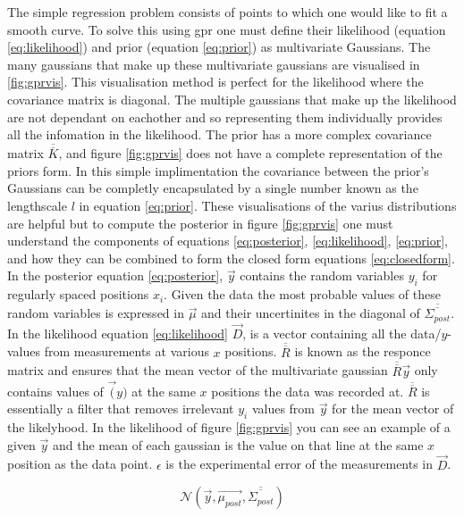 The simple regression problem consists of points to which one would like to fit a smooth curve. To solve this using \gls{gpr} one must define their likelihood (equation \ref{eq:likelihood}) and prior (equation \ref{eq:prior}) as multivariate Gaussians. The many gaussians that make up these multivariate gaussians are visualised in \ref{fig:gprvis}. This visualisation method is perfect for the likelihood where the covariance matrix is diagonal. The multiple gaussians that make up the likelihood are not dependant on eachother and so representing them individually provides all the infomation in the likelihood. The prior has a more complex covariance matrix $\overline{\overline{K}}$, and figure \ref{fig:gprvis} does not have a complete representation of the priors form. In this simple implimentation the covariance between the prior's Gaussians can be completly encapsulated by a single number known as the lengthscale $l$ in equation \ref{eq:prior}. These visualisations of the varius distributions are helpful but to compute the posterior in figure \ref{fig:gprvis} one must understand the components of equations \ref{eq:posterior}, \ref{eq:likelihood}, \ref{eq:prior}, and how they can be combined to form the closed form equations \ref{eq:closedform}. In the posterior equation \ref{eq:posterior}, $\Vec{y}$ contains the random variables $y_i$ for regularly spaced positions $x_i$. Given the data the most probable values of these random variables is expressed in $\Vec{\mu}$ and their uncertinites in the diagonal of $\overline{\overline{\Sigma_{post}}}$. In the likelihood equation \ref{eq:likelihood} $\Vec{D}$, is a vector containing all the data/$y$-values from measurements at various $x$ positions. $\overline{\overline{R}}$ is known as the responce matrix and ensures that the mean vector of the multivariate gaussian $\overline{\overline{R}}\Vec{y}$ only contains values of $\Vec(y)$ at the same $x$ positions the data was recorded at. $\overline{\overline{R}}$ is essentially a filter that removes irrelevant $y_i$ values from $\Vec{y}$ for the mean vector of the likelyhood. In the likelihood of figure \ref{fig:gprvis} you can see an example of a given $\Vec{y}$ and the mean of each gaussian is the value on that line at the same $x$ position as the data point. $\epsilon$ is the experimental error of the measurements in $\Vec{D}$. 

\begin{equation}
  \mathcal{N}(\Vec{y}, \Vec{\mu_{post}}, \overline{\overline{\Sigma_{post}}})
  \label{eq:posterior}
\end{equation}

